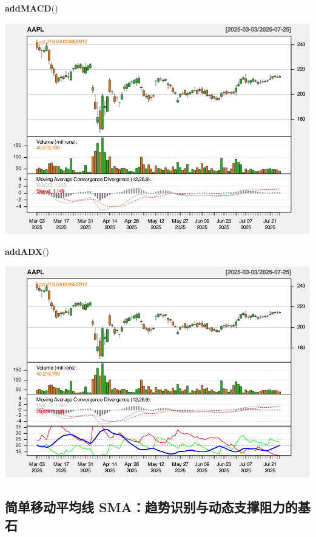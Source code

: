 \documentclass[]{ctexbook}
\newenvironment{Shaded}{\begin{snugshade}}{\end{snugshade}}
\newcommand{\FunctionTok}[1]{\textcolor[rgb]{0.13,0.29,0.53}{\textbf{#1}}}
\newcommand{\NormalTok}[1]{#1}
\begin{document}
\begin{Shaded}
\begin{Highlighting}[]
\FunctionTok{addMACD}\NormalTok{()}
\end{Highlighting}
\end{Shaded}

\includegraphics[width=0.9\linewidth]{QuantmodHandbook_files/figure-latex/adx_2-2}

\begin{Shaded}
\begin{Highlighting}[]
\FunctionTok{addADX}\NormalTok{()  }
\end{Highlighting}
\end{Shaded}

\includegraphics[width=0.9\linewidth]{QuantmodHandbook_files/figure-latex/adx_2-3}

\subsection{简单移动平均线 SMA：趋势识别与动态支撑阻力的基石}\label{ux7b80ux5355ux79fbux52a8ux5e73ux5747ux7ebf-smaux8d8bux52bfux8bc6ux522bux4e0eux52a8ux6001ux652fux6491ux963bux529bux7684ux57faux77f3}
\end{document}
